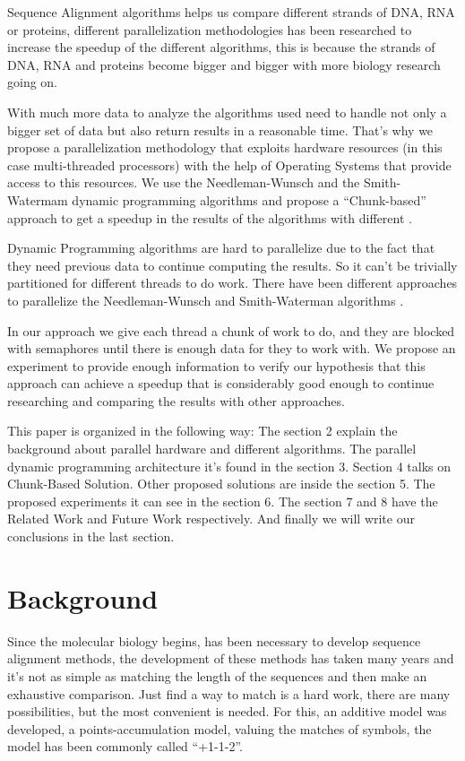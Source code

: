 \documentclass[journal]{IEEEtran}
\begin{document}
Sequence Alignment algorithms helps us compare different strands of DNA, RNA or proteins, different parallelization methodologies has been researched to increase the speedup of the different algorithms, this is because the strands of DNA, RNA and proteins become bigger and bigger with more biology research going on.

With much more data to analyze the algorithms used need to handle not only a bigger set of data but also return results in a reasonable time. That's why we propose a parallelization methodology that exploits hardware resources (in this case multi-threaded processors) with the help of Operating Systems that provide access to this resources. We use the Needleman-Wunsch and the Smith-Watermam dynamic programming algorithms and propose a ``Chunk-based'' approach to get a speedup in the results of the algorithms with different \cite{galper1990parallel}.

Dynamic Programming algorithms are hard to parallelize due to the fact that they need previous data to continue computing the results. So it can't be trivially partitioned for different threads to do work. There have been different approaches to parallelize the Needleman-Wunsch and Smith-Waterman algorithms \cite{liu2013cudasw++, rognes2011faster, manavski2008cuda, tahirParallelNW}.

In our approach we give each thread a chunk of work to do, and they are blocked with semaphores until there is enough data for they to work with. We propose an experiment to provide enough information to verify our hypothesis that this approach can achieve a speedup that is considerably good enough to continue researching and comparing the results with other approaches. 

This paper is organized in the following way: The section 2 explain the background about parallel hardware and different algorithms. The parallel dynamic programming architecture it's found in the section 3. Section 4 talks on Chunk-Based Solution. Other proposed solutions are inside the section 5. The proposed experiments it can see in the section 6. The section 7 and 8 have the Related Work and Future Work respectively. And finally we will write our conclusions in the last section.

\section{Background}

Since the molecular biology begins, has been necessary to develop sequence alignment methods, the development of these methods has taken many years and it's not as simple as matching the length of the sequences and then make an exhaustive comparison. Just find a way to match is a hard work, there are many possibilities, but the most convenient is needed. For this, an additive model was developed, a points-accumulation model, valuing the matches of symbols, the model has been commonly called ``+1-1-2''.
\end{document}
